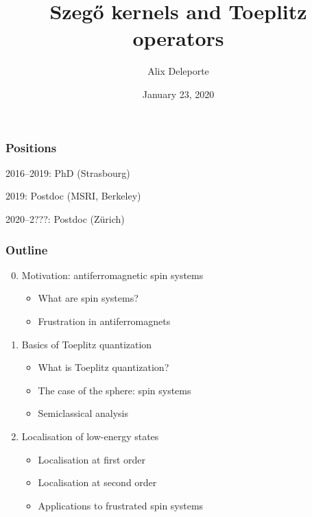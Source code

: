 \documentclass[mathserif]{beamer}
\title{Szeg\H{o} kernels and Toeplitz operators}
\author{Alix Deleporte}
\date{January 23, 2020}
\institute[UZH]{Institut für Mathematik\\Universität Zürich}
\begin{document}
\beamertemplatenavigationsymbolsempty

    \expandafter\def\expandafter\insertshorttitle\expandafter{%
       \insertshorttitle\hfill%
       }%


\begin{frame}
	\titlepage
      \end{frame}

      \begin{frame}
  \frametitle{Positions}
  2016--2019: PhD (Strasbourg)

  \vfill

  2019: Postdoc (MSRI, Berkeley)

  \vfill

  2020--2???: Postdoc (Zürich)
\end{frame}

      \begin{frame}
        \frametitle{Outline}
        \begin{enumerate}\setcounter{enumi}{-1}
        \item Motivation: antiferromagnetic spin systems
          \begin{itemize}
          \item What are spin systems?
          \item Frustration in antiferromagnets
          \end{itemize}
        \item Basics of Toeplitz quantization
          \begin{itemize}
          \item What is Toeplitz quantization?
          \item The case of the sphere: spin systems
          \item Semiclassical analysis
          \end{itemize}
        \item Localisation of low-energy states
          \begin{itemize}
          \item Localisation at first order
          \item Localisation at second order
          \item Applications to frustrated spin systems
          \end{itemize}
        \end{enumerate}
      \end{frame}
\end{document}
